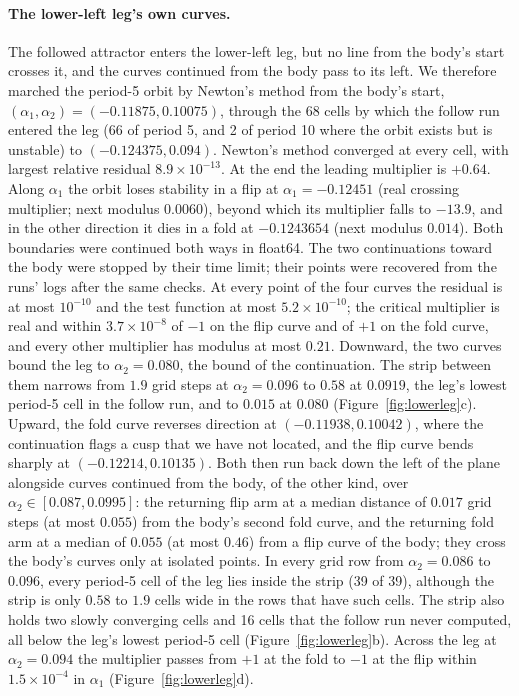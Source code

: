 \documentclass[11pt,letterpaper]{article}
\begin{document}
\paragraph{The lower-left leg's own curves.} The followed attractor enters the lower-left leg, but no line from the
body's start crosses it, and the curves continued from the body pass to its left. We therefore marched the period-5
orbit by Newton's method from the body's start, $(\alpha_1,\alpha_2)=(-0.11875,0.10075)$, through the 68 cells by which
the follow run entered the leg (66 of period 5, and 2 of period 10 where the orbit exists but is unstable) to
$(-0.124375,0.094)$. Newton's method converged at every cell, with largest relative residual $8.9\times10^{-13}$. At the
end the leading multiplier is $+0.64$. Along $\alpha_1$ the orbit loses stability in a flip at $\alpha_1=-0.12451$
(real crossing multiplier; next modulus $0.0060$), beyond which its multiplier falls to $-13.9$, and in the other
direction it dies in a fold at $-0.1243654$ (next modulus $0.014$). Both boundaries were continued both ways in float64.
The two continuations toward the body were stopped by their time limit; their points were recovered from the runs' logs
after the same checks. At every point of the four curves the residual is at most $10^{-10}$ and the test function at
most $5.2\times10^{-10}$; the critical multiplier is real and within $3.7\times10^{-8}$ of $-1$ on the flip curve and
of $+1$ on the fold curve, and every other multiplier has modulus at most $0.21$. Downward, the two curves bound the leg
to $\alpha_2=0.080$, the bound of the continuation. The strip between them narrows from $1.9$ grid steps at
$\alpha_2=0.096$ to $0.58$ at $0.0919$, the leg's lowest period-5 cell in the follow run, and to $0.015$ at $0.080$
(Figure~\ref{fig:lowerleg}c). Upward, the fold curve reverses direction at $(-0.11938,0.10042)$, where the continuation
flags a cusp that we have not located, and the flip curve bends sharply at $(-0.12214,0.10135)$. Both then run back
down the left of the plane alongside curves continued from the body, of the other kind, over
$\alpha_2\in[0.087,0.0995]$: the returning flip arm at a median distance of $0.017$ grid steps (at most $0.055$) from
the body's second fold curve, and the returning fold arm at a median of $0.055$ (at most $0.46$) from a flip curve of
the body; they cross the body's curves only at isolated points. In every grid row from $\alpha_2=0.086$ to $0.096$, every period-5 cell of the leg lies inside the
strip (39 of 39), although the strip is only $0.58$ to $1.9$ cells wide in the rows that have such cells. The strip also
holds two slowly converging cells and 16 cells that the follow run never computed, all below the leg's lowest period-5 cell
(Figure~\ref{fig:lowerleg}b). Across the leg at $\alpha_2=0.094$ the multiplier passes from $+1$ at the fold to $-1$ at
the flip within $1.5\times10^{-4}$ in $\alpha_1$ (Figure~\ref{fig:lowerleg}d).
\end{document}
